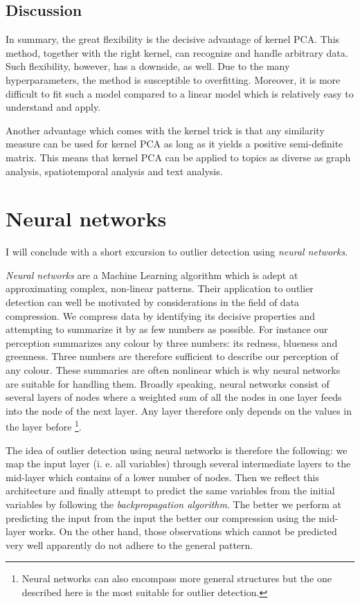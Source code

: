 \documentclass[]{report}
\let\rmarkdownfootnote\footnote%
\def\footnote{\protect\rmarkdownfootnote}
\theoremstyle{definition}
\theoremstyle{definition}
\theoremstyle{definition}
\theoremstyle{remark}
\begin{document}
\hypertarget{discussion-2}{%
\subsection{Discussion}\label{discussion-2}}

In summary, the great flexibility is the decisive advantage of kernel
PCA. This method, together with the right kernel, can recognize and
handle arbitrary data. Such flexibility, however, has a downside, as
well. Due to the many hyperparameters, the method is susceptible to
overfitting. Moreover, it is more difficult to fit such a model compared
to a linear model which is relatively easy to understand and apply.

Another advantage which comes with the kernel trick is that any
similarity measure can be used for kernel PCA as long as it yields a
positive semi-definite matrix. This means that kernel PCA can be applied
to topics as diverse as graph analysis, spatiotemporal analysis and text
analysis.

\hypertarget{neural-networks}{%
\section{Neural networks}\label{neural-networks}}

I will conclude with a short excursion to outlier detection using
\emph{neural networks}.

\emph{Neural networks} are a Machine Learning algorithm which is adept
at approximating complex, non-linear patterns. Their application to
outlier detection can well be motivated by considerations in the field
of data compression. We compress data by identifying its decisive
properties and attempting to summarize it by as few numbers as possible.
For instance our perception summarizes any colour by three numbers: its
redness, blueness and greenness. Three numbers are therefore sufficient
to describe our perception of any colour. These summaries are often
nonlinear which is why neural networks are suitable for handling them.
Broadly speaking, neural networks consist of several layers of nodes
where a weighted sum of all the nodes in one layer feeds into the node
of the next layer. Any layer therefore only depends on the values in the
layer before \footnote{Neural networks can also encompass more general
  structures but the one described here is the most suitable for outlier
  detection.}.

The idea of outlier detection using neural networks is therefore the
following: we map the input layer (i. e. all variables) through several
intermediate layers to the mid-layer which contains of a lower number of
nodes. Then we reflect this architecture and finally attempt to predict
the same variables from the initial variables by following the
\emph{backpropagation algorithm}. The better we perform at predicting
the input from the input the better our compression using the mid-layer
works. On the other hand, those observations which cannot be predicted
very well apparently do not adhere to the general pattern.
\end{document}

